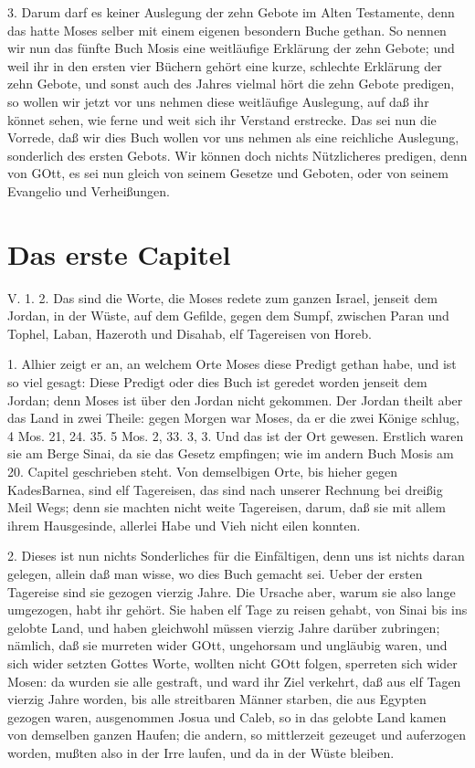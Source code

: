 3. Darum darf es keiner Auslegung der zehn Gebote im Alten Testamente, denn das hatte Moses selber mit einem eigenen besondern Buche gethan. So nennen wir nun das fünfte Buch Mosis eine weitläufige Erklärung der zehn Gebote; und weil ihr in den ersten vier Büchern gehört eine kurze, schlechte Erklärung der zehn Gebote, und sonst auch des Jahres vielmal hört die zehn Gebote predigen, so wollen wir jetzt vor uns nehmen diese weitläufige Auslegung, auf daß ihr könnet sehen, wie ferne und weit sich ihr Verstand erstrecke. Das sei nun die Vorrede, daß wir dies Buch wollen vor uns nehmen als eine reichliche Auslegung, sonderlich des ersten Gebots. Wir können doch nichts Nützlicheres predigen, denn von GOtt, es sei nun gleich von seinem Gesetze und Geboten, oder von seinem Evangelio und Verheißungen.

\section{Das erste Capitel}

\begin{schriftzitat}
V. 1. 2. Das sind die Worte, die Moses redete zum ganzen Israel, jenseit dem Jordan, in der Wüste, auf dem Gefilde, gegen dem Sumpf, zwischen Paran und Tophel, Laban, Hazeroth und Disahab, elf Tagereisen von Horeb.
\end{schriftzitat}

1. Alhier zeigt er an, an welchem Orte Moses diese Predigt gethan habe, und ist so viel gesagt: Diese Predigt oder dies Buch ist geredet worden jenseit dem Jordan; denn Moses ist über den Jordan nicht gekommen. Der Jordan theilt aber das Land in zwei Theile: gegen Morgen war Moses, da er die zwei Könige schlug, 4 Mos. 21, 24. 35. 5 Mos. 2, 33. 3, 3. Und das ist der Ort gewesen. Erstlich waren sie am Berge Sinai, da sie das Gesetz empfingen; wie im andern Buch Mosis am 20. Capitel geschrieben steht. Von demselbigen Orte, bis hieher gegen KadesBarnea, sind elf Tagereisen, das sind nach unserer Rechnung bei dreißig Meil Wegs; denn sie machten nicht weite Tagereisen, darum, daß sie mit allem ihrem Hausgesinde, allerlei Habe und Vieh nicht eilen konnten.

2. Dieses ist nun nichts Sonderliches für die Einfältigen, denn uns ist nichts daran gelegen, allein daß man wisse, wo dies Buch gemacht sei. Ueber der ersten Tagereise sind sie gezogen vierzig Jahre. Die Ursache aber, warum sie also lange umgezogen, habt ihr gehört. Sie haben elf Tage zu reisen gehabt, von Sinai bis ins gelobte Land, und haben gleichwohl müssen vierzig Jahre darüber zubringen; nämlich, daß sie murreten wider GOtt, ungehorsam und ungläubig waren, und sich wider setzten Gottes Worte, wollten nicht GOtt folgen, sperreten sich wider Mosen: da wurden sie alle gestraft, und ward ihr Ziel verkehrt, daß aus elf Tagen vierzig Jahre worden, bis alle streitbaren Männer starben, die aus Egypten gezogen waren, ausgenommen Josua und Caleb, so in das gelobte Land kamen von demselben ganzen Haufen; die andern, so mittlerzeit gezeuget und auferzogen worden, mußten also in der Irre laufen, und da in der Wüste bleiben.

